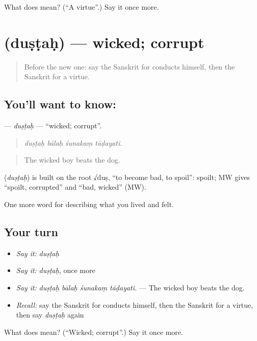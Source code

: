 \begin{tcolorbox}[breakable,colback=teal!4,colframe=teal!35!black,title={Before you move on}]
What does  mean? (\textquotedblleft{}A virtue\textquotedblright{}.) Say it once more.
\end{tcolorbox}
\section[\texorpdfstring{\sk{दुष्टः} (duṣṭaḥ)}{दुष्टः (duṣṭaḥ)}]{ (duṣṭaḥ) — wicked; corrupt}

\label{lesson:SA-C460-dustah}



\begin{quote}
Before the new one: say the Sanskrit for conducts himself, then the Sanskrit for a virtue.
\end{quote}

\subsection*{You'll want to know: }
\textbf{} — \emph{duṣṭaḥ} — \textquotedblleft{}wicked; corrupt\textquotedblright{}.

\begin{quote}
   
\end{quote}

\begin{quote}
\emph{duṣṭaḥ bālaḥ śunakaṃ tāḍayati.}
\end{quote}

\begin{quote}
The wicked boy beats the dog.
\end{quote}

\begin{cousinweb}
\textbf{} (\emph{duṣṭaḥ}) is built on the root √duṣ, \textquotedblleft{}to become bad, to spoil\textquotedblright{}: spoilt; MW gives \textquotedblleft{}spoilt, corrupted\textquotedblright{} and \textquotedblleft{}bad, wicked\textquotedblright{} (MW).
\end{cousinweb}

\begin{grammarlens}[title={What you've built}]
One more word for describing what you lived and felt.
\end{grammarlens}

\subsection*{Your turn}
\begin{itemize}
\raggedright
  \item \emph{Say it:} \emph{duṣṭaḥ}
  \item \emph{Say it:} \emph{duṣṭaḥ}, once more
  \item \emph{Say it:} \emph{duṣṭaḥ bālaḥ śunakaṃ tāḍayati.} — The wicked boy beats the dog.
  \item \emph{Recall:} say the Sanskrit for conducts himself, then the Sanskrit for a virtue, then say \emph{duṣṭaḥ} again
\end{itemize}

\begin{tcolorbox}[breakable,colback=teal!4,colframe=teal!35!black,title={Before you move on}]
What does  mean? (\textquotedblleft{}Wicked; corrupt\textquotedblright{}.) Say it once more.
\end{tcolorbox}
